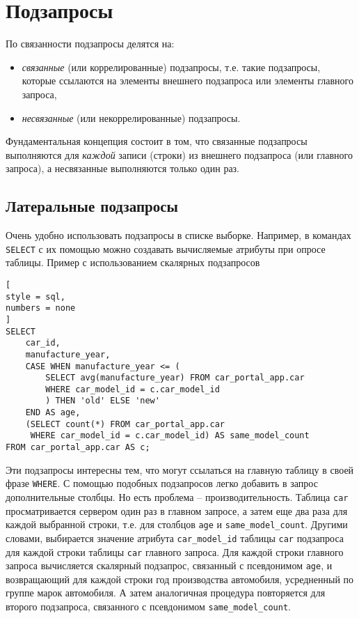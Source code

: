\documentclass[%
	11pt,
	a4paper,
	utf8,
		]{article}
\begin{document}
\section{Подзапросы}

По связанности подзапросы делятся на:
\begin{itemize}
	\item \emph{связанные} (или коррелированные) подзапросы, т.е. такие подзапросы, которые ссылаются на элементы внешнего подзапроса или элементы главного запроса,
	
	\item \emph{несвязанные} (или некоррелированные) подзапросы.
\end{itemize}

Фундаментальная концепция состоит в том, что связанные подзапросы выполняются для \emph{каждой} записи (строки) из внешнего подзапроса (или главного запроса), а несвязанные выполняются только один раз.

\subsection{Латеральные подзапросы}

Очень удобно использовать подзапросы в списке выборке. Например, в командах \texttt{SELECT} с их помощью можно создавать вычисляемые атрибуты при опросе таблицы. Пример с использованием скалярных подзапросов
\begin{lstlisting}[
style = sql,
numbers = none
]
SELECT
    car_id,
    manufacture_year,
    CASE WHEN manufacture_year <= (
        SELECT avg(manufacture_year) FROM car_portal_app.car
        WHERE car_model_id = c.car_model_id
        ) THEN 'old' ELSE 'new'
    END AS age,
    (SELECT count(*) FROM car_portal_app.car
     WHERE car_model_id = c.car_model_id) AS same_model_count
FROM car_portal_app.car AS c;
\end{lstlisting}

Эти подзапросы интересны тем, что могут ссылаться на главную таблицу в своей фразе \texttt{WHERE}. С помощью подобных подзапросов легко добавить в запрос дополнительные столбцы. Но есть проблема -- производительность. Таблица \texttt{car} просматривается сервером один раз в главном запросе, а затем еще два раза для каждой выбранной строки, т.е. для столбцов \texttt{age} и \texttt{same\_model\_count}. Другими словами, выбирается значение атрибута \texttt{car\_model\_id} таблицы \texttt{car} подзапроса для каждой строки таблицы \texttt{car} главного запроса. Для каждой строки главного запроса вычисляется скалярный подзапрос, связанный с псевдонимом \texttt{age}, и возвращающий для каждой строки год производства автомобиля, усредненный по группе марок автомобиля. А затем аналогичная процедура повторяется для второго подзапроса, связанного с псевдонимом \texttt{same\_model\_count}.
\end{document}
